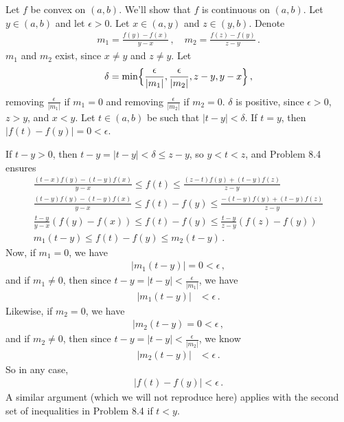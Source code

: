 \documentclass{article}
\begin{document}
Let $f$ be convex on $(a,b)$. We'll show that $f$ is continuous on $(a,b)$.
Let $y \in (a,b)$ and let $\epsilon > 0$. Let $x \in (a, y)$ and $z \in (y, b)$.
Denote
\begin{align*}
    m_1 = \frac{f(y) - f(x)}{y-x}\,, \quad
    m_2 = \frac{f(z) - f(y)}{z-y} \,.
\end{align*}
$m_1$ and $m_2$ exist, since $x \neq y$ and $z \neq y$. Let
\begin{align*}
    \delta = \min \Bigl\{ \frac{\epsilon}{|m_1|}, \frac{\epsilon}{|m_2|}, z-y, y-x \Bigr\} \,,
\end{align*}
removing $\frac{\epsilon}{|m_1|}$ if $m_1 = 0$ and removing $\frac{\epsilon}{|m_2|}$
if $m_2 = 0$.
$\delta$ is positive, since $\epsilon > 0$, $z > y$, and $x < y$.
Let $t \in (a,b)$ be such that $|t-y| < \delta$. If $t = y$,
then $|f(t) - f(y)| = 0 < \epsilon$.

If $t - y > 0$, then $t-y = |t-y| < \delta \leq z-y$, so
$y < t < z$, and Problem 8.4 ensures
\begin{gather*}
    \frac{(t-x)f(y) - (t-y)f(x)}{y-x} \leq f(t) \leq \frac{(z-t)f(y)+(t-y)f(z)}{z-y} \\
    \frac{(t-y)f(y) - (t-y)f(x)}{y-x} \leq f(t) - f(y) \leq \frac{-(t-y)f(y)+(t-y)f(z)}{z-y} \\
    \frac{t-y}{y-x} (f(y) - f(x)) \leq f(t) - f(y) \leq \frac{t-y}{z-y} (f(z) - f(y)) \\
    m_1 (t-y) \leq f(t) - f(y) \leq m_2 (t-y) \,.
\end{gather*}
Now, if $m_1 = 0$, we have
\begin{align*}
    |m_1(t-y)| = 0 < \epsilon \,,
\end{align*}
and if $m_1 \neq 0$, then since
$t-y = |t-y| < \frac{\epsilon}{|m_1|}$, we have
\begin{align*}
    |m_1(t-y)| &< \epsilon \,.
\end{align*}
Likewise, if $m_2 = 0$, we have
\begin{align*}
    |m_2(t-y) = 0 < \epsilon \,,
\end{align*}
and if $m_2 \neq 0$, then since $t-y = |t-y| < \frac{\epsilon}{|m_2|}$, we know
\begin{align*}
    |m_2(t-y)| &< \epsilon \,.
\end{align*}
So in any case,
\begin{align*}
    \bigl|f(t) - f(y)\bigr| < \epsilon \,.
\end{align*}
A similar argument (which we will not reproduce here) applies with the second set of inequalities in Problem 8.4
if $t < y$.
\end{document}
